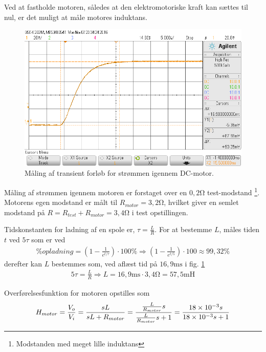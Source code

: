 Ved at fastholde motoren, således at den elektromotoriske kraft kan sættes til nul, er det muligt at måle motores induktans.
\begin{figure}[h!]
	\centering
	\includegraphics[width=.8\textwidth]{billeder/motor_L.png}
	\caption{Måling af transient forløb for strømmen igennem DC-motor.}
	\label{fig:motor_dynamik_scoop}
\end{figure}
\FloatBlock
Måling af strømmen igennem motoren er forstaget over en $0,2 \si{\ohm}$ test-modstand
\footnote{Modstanden med meget lille induktans}.
Motorens egen modstand er målt til $R_{motor} = 3,2 \si{\ohm}$, hvilket giver en semlet modstand på $R = R_{test} + R_{motor} = 3,4 \si{\ohm}$ i test opstillingen. 

Tidskonstanten for ladning af en spole er, $\tau = \frac{L}{R}$.
For at bestemme $L$, måles tiden $t$ ved $5\tau$ som er ved
\begin{align}
	\% opladning = \left( 1 - \frac{1}{e^{t/\tau}} \right) \cdot 100\% \Rightarrow  \left( 1 - \frac{1}{e^{t/5}} \right) \cdot 100 \approx 99,32\% 
\end{align}
derefter kan $L$ bestemmes som, ved aflæst tid på $16,9\si{\milli\second}$ i fig. \ref{fig:motor_dynamik_scoop} 
\begin{align}
	5\tau = \frac{L}{R} \Rightarrow L = 16,9\si{\milli\second} \cdot 3,4 \si{\ohm} = 57,5 \si{\milli\henry}
\end{align}


Overførelsesfunktion for motoren opstilles som
\begin{align}
H_{motor} = \frac{V_o}{V_i} = \frac{sL}{sL+R_{motor}} = \frac{ \frac{L}{R_{motor}}s}{ \frac{L}{R_{motor}}s +1} = \frac{\num{18E-3}s}{\num{18E-3}s +1}
\end{align}  


